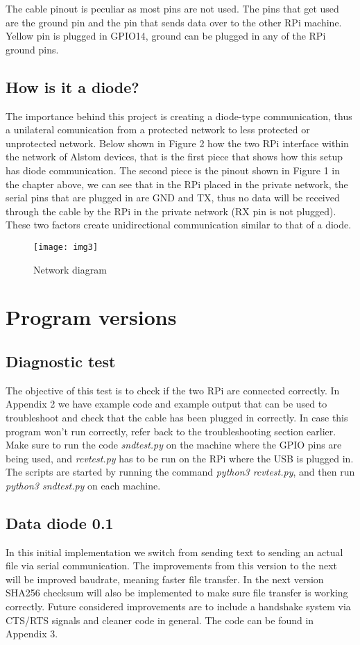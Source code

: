 \documentclass[a4paper,11pt]{scrartcl}
\begin{document}
The cable pinout is peculiar as most pins are not used. The pins that get used are the ground pin and the pin that sends data over to the other RPi machine. Yellow pin is plugged in GPIO14, ground can be plugged in any of the RPi ground pins.

\subsection{How is it a diode?}
The importance behind this project is creating a diode-type communication, thus a unilateral comunication from a protected network to less protected or unprotected network. Below shown in Figure 2 how the two RPi interface within the network of Alstom devices, that is the first piece that shows how this setup has diode communication. The second piece is the pinout shown in Figure 1 in the chapter above, we can see that in the RPi placed in the private network, the serial pins that are plugged in are GND and TX, thus no data will be received through the cable by the RPi in the private network (RX pin is not plugged). These two factors create unidirectional communication similar to that of a diode. 
\begin{figure}[h!]
    \texttt{[image: img3]}
    \caption{Network diagram}
    \label{fig:figure2}
\end{figure}


\section{Program versions}
\subsection{Diagnostic test}
The objective of this test is to check if the two RPi are connected correctly. In Appendix 2 we have example code and example output that can be used to troubleshoot and check that the cable has been plugged in correctly. 
In case this program won't run correctly, refer back to the troubleshooting section earlier. Make sure to run the code \textit{sndtest.py} on the machine where the GPIO pins are being used, and \textit{rcvtest.py} has to be run on the RPi where the USB is plugged in. 
The scripts are started by running the command \textit{python3 rcvtest.py}, and then run \textit{python3 sndtest.py} on each machine. 

\subsection{Data diode 0.1}
In this initial implementation we switch from sending text to sending an actual file via serial communication. The improvements from this version to the next will be improved baudrate, meaning faster file transfer. 
In the next version SHA256 checksum will also be implemented to make sure file transfer is working correctly. Future considered improvements are to include a handshake system via CTS/RTS signals and cleaner code in general. The code can be found in Appendix 3.  
\end{document}
